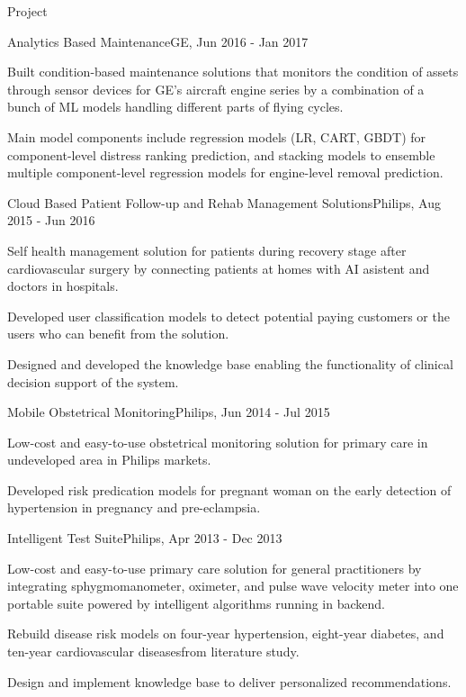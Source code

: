 \documentclass{resume} %
\begin{document}
\begin{rSection}{Project}
\begin{rSubsection}{Analytics Based Maintenance}{}{GE, Jun 2016 - Jan 2017}{}
\item Built condition-based maintenance solutions that monitors the condition of assets through sensor devices for GE's aircraft engine series by a combination of a bunch of ML models handling different parts of flying cycles.
\item Main model components include regression models (LR, CART, GBDT) for component-level distress ranking prediction, and stacking models to ensemble multiple component-level regression models for engine-level removal prediction.
\end{rSubsection}


\begin{rSubsection}{Cloud Based Patient Follow-up and Rehab Management Solutions}{}{Philips, Aug 2015 - Jun 2016}{}
\item Self health management solution for patients during recovery stage after cardiovascular surgery by connecting patients at homes with AI asistent and doctors in hospitals.
\item Developed user classification models to detect potential paying customers or the users who can benefit from the solution.
\item Designed and developed the knowledge base enabling the functionality of clinical decision support of the system.
\end{rSubsection}


\begin{rSubsection}{Mobile Obstetrical Monitoring}{}{Philips, Jun 2014 - Jul 2015}{}
\item Low-cost and easy-to-use obstetrical monitoring solution for primary care in undeveloped area in Philips markets.
\item Developed risk predication models for pregnant woman on the early detection of hypertension in pregnancy and pre-eclampsia.
\end{rSubsection}


\begin{rSubsection}{Intelligent Test Suite}{}{Philips, Apr 2013 - Dec 2013}{}
\item Low-cost and easy-to-use primary care solution for general practitioners by integrating sphygmomanometer, oximeter, and pulse wave velocity meter into one portable suite powered by intelligent algorithms running in backend.
\item Rebuild disease risk models on four-year hypertension, eight-year diabetes, and ten-year cardiovascular diseasesfrom literature study.
\item Design and implement knowledge base to deliver personalized recommendations.
\end{rSubsection}

\end{rSection}
\end{document}
